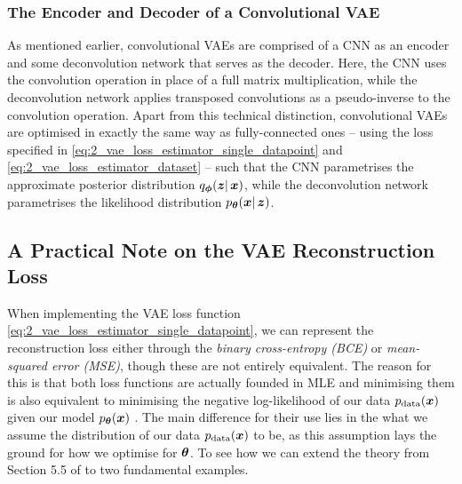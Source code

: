 \subsubsection{The Encoder and Decoder of a Convolutional VAE}
As mentioned earlier, convolutional VAEs are comprised of a CNN as an encoder and some deconvolution network that serves as the decoder. Here, the CNN uses the convolution operation in place of a full matrix multiplication, while the deconvolution network applies transposed convolutions as a pseudo-inverse to the convolution operation.
Apart from this technical distinction, convolutional VAEs are optimised in exactly the same way as fully-connected ones -- using the loss specified in \eqref{eq:2_vae_loss_estimator_single_datapoint} and \eqref{eq:2_vae_loss_estimator_dataset} -- such that the CNN parametrises the approximate posterior distribution $q_{\boldsymbol{\phi}}(\boldsymbol{z} |\, \boldsymbol{x})$, while the deconvolution network parametrises the likelihood distribution $p_{\boldsymbol{\theta}}(\boldsymbol{x} |\, \boldsymbol{z})$. 


\subsection{A Practical Note on the VAE Reconstruction Loss}
\label{subsec:2_vae_recons_loss}
When implementing the VAE loss function \eqref{eq:2_vae_loss_estimator_single_datapoint}, we can represent the reconstruction loss either through the \textit{binary cross-entropy (BCE)} or \textit{mean-squared error (MSE)}, though these are not entirely equivalent.
The reason for this is that both loss functions are actually founded in MLE and minimising them is also equivalent to minimising the negative log-likelihood of our data $p_{\text{data}}(\boldsymbol{x})$ given our model $p_{\boldsymbol{\theta}}(\boldsymbol{x})$ \cite{DeepLearningBook}. The main difference for their use lies in the what we assume the distribution of our data $p_{\text{data}}(\boldsymbol{x})$ to be, as this assumption lays the ground for how we optimise for $\boldsymbol{\theta}$.
To see how we can extend the theory from Section 5.5 of \cite{DeepLearningBook} to two fundamental examples.

